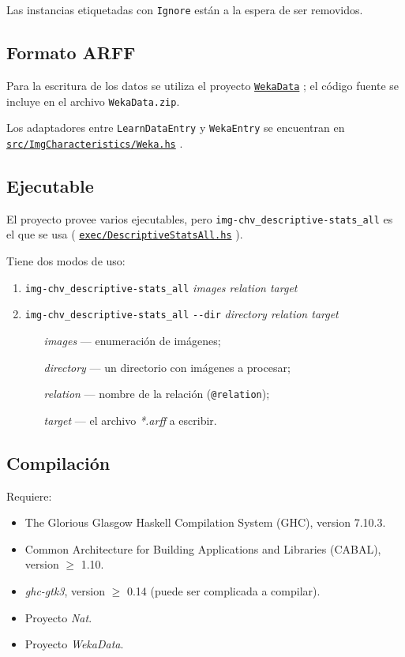 \documentclass{article}
\newcommand\refcode[2]{ \href{#1}{\texttt{#2}} }
\begin{document}
Las instancias etiquetadas con \verb|Ignore| están a la espera de ser removidos.

\subsection{Formato ARFF}

Para la escritura de los datos se utiliza el proyecto \refcode{\WekaData}{WekaData}; el código fuente se incluye en el archivo \verb|WekaData.zip|.

Los adaptadores entre \verb|LearnDataEntry| y \verb|WekaEntry| se encuentran en\\ \refcode{\Weka}{src/ImgCharacteristics/Weka.hs}.

\subsection{Ejecutable}
El proyecto provee varios ejecutables, pero \verb|img-chv_descriptive-stats_all| es el que se usa (\refcode{\ExecAll}{exec/DescriptiveStatsAll.hs}).

Tiene dos modos de uso:
\begin{enumerate}
\item \texttt{img-chv\_descriptive-stats\_all} \textit{images relation target}
\item \texttt{img-chv\_descriptive-stats\_all} \verb|--dir| 
       \textit{directory relation target}
    \begin{itemize}[leftmargin=2cm]
        \item[\textit{images}]   --- enumeración de imágenes;
        \item[\textit{directory}]--- un directorio con imágenes a procesar;
        \item[\textit{relation}] --- nombre de la relación (\verb|@relation|);
        \item[\textit{target}]   --- el archivo \emph{*.arff} a escribir.
    \end{itemize}
\end{enumerate}

\subsection{Compilación}

Requiere:
\begin{itemize}
    \item The Glorious Glasgow Haskell Compilation System (GHC), version 7.10.3.
    \item Common Architecture for Building Applications and Libraries (CABAL),
          version $\geq$ 1.10.
    \item \emph{ghc-gtk3}, version $\geq$ 0.14 (puede ser complicada a compilar).
    \item Proyecto \emph{Nat}.
    \item Proyecto \emph{WekaData}.
\end{itemize}
\end{document}
